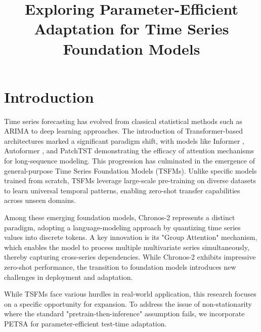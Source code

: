 \documentclass[conference]{IEEEtran}
\begin{document}
\title{Exploring Parameter-Efficient Adaptation for Time Series Foundation Models}

\author{
}

\maketitle

\begin{abstract}
\end{abstract}

\section{Introduction}

Time series forecasting has evolved from classical statistical methods such as ARIMA \cite{box2015time} to deep learning approaches. The introduction of Transformer-based architectures marked a significant paradigm shift, with models like Informer \cite{zhou2021informer}, Autoformer \cite{wu2021autoformer}, and PatchTST \cite{nie2023patchtst} demonstrating the efficacy of attention mechanisms for long-sequence modeling. This progression has culminated in the emergence of general-purpose Time Series Foundation Models (TSFMs). Unlike specific models trained from scratch, TSFMs leverage large-scale pre-training on diverse datasets to learn universal temporal patterns, enabling zero-shot transfer capabilities across unseen domains.

Among these emerging foundation models, Chronos-2 \cite{ansari2025chronos2univariateuniversalforecasting} represents a distinct paradigm, adopting a language-modeling approach by quantizing time series values into discrete tokens. A key innovation is its "Group Attention" mechanism, which enables the model to process multiple multivariate series simultaneously, thereby capturing cross-series dependencies. While Chronos-2 exhibits impressive zero-shot performance, the transition to foundation models introduces new challenges in deployment and adaptation.

While TSFMs face various hurdles in real-world application, this research focuses on a specific opportunity for expansion. To address the issue of non-stationarity where the standard "pretrain-then-inference" assumption fails, we incorporate PETSA \cite{medeiros2025accurateparameterefficienttesttimeadaptation} for parameter-efficient test-time adaptation.
\end{document}
